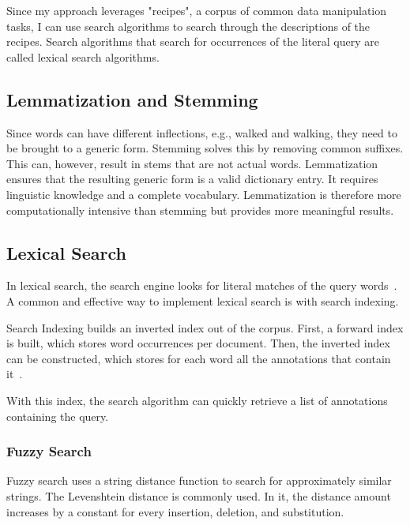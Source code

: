 \documentclass[
     12pt,                    %
     a4paper,             %
     BCOR=10mm,     %
     DIV=14,                 %
     listof=totoc,                    %
     bibliography=totoc,       %
     index=totoc,              %
     twoside,
     headsepline
     ]{scrreprt}
\begin{document}
Since my approach leverages "recipes", a corpus of common data manipulation tasks, I can use search algorithms to search through the descriptions of the recipes. Search algorithms that search for occurrences of the literal query are called lexical search algorithms.

\subsection{Lemmatization and Stemming}\label{lemmatize}

Since words can have different inflections, e.g., walked and walking, they need to be brought to a generic form. Stemming solves this by removing common suffixes. This can, however, result in stems that are not actual words. Lemmatization ensures that the resulting generic form is a valid dictionary entry. It requires linguistic knowledge and a complete vocabulary. Lemmatization is therefore more computationally intensive than stemming but provides more meaningful results.

\subsection{Lexical Search} \label{indexsearch}

In lexical search, the search engine looks for literal matches of the query words~\cite{bast2016semantic}.
A common and effective way to implement lexical search is with search indexing.

Search Indexing builds an inverted index out of the corpus. First, a forward index is built, which stores word occurrences per document. Then, the inverted index can be constructed, which stores for each word all the annotations that contain it~\cite{das2012indexing}.

With this index, the search algorithm can quickly retrieve a list of annotations containing the query.

\subsubsection{Fuzzy Search}

Fuzzy search uses a string distance function to search for approximately similar strings. The Levenshtein distance is commonly used. In it, the distance amount increases by a constant for every insertion, deletion, and substitution.
\end{document}
